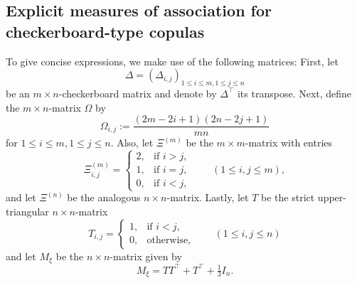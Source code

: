 \documentclass{article}
\theoremstyle{definition}
\begin{document}
\subsection{Explicit measures of association for checkerboard-type copulas}
\label{subsec:checkerboard_measures}
To give concise expressions, we make use of the following matrices:
First, let 
\[
   \Delta =\left(\Delta_{i,j}\right)_{1\le i\le m,1\le j\le n}
\]
be an $m\times n$-checkerboard matrix and denote by $\Delta^\top$ its transpose.
Next, define the $m\times n$-matrix $\Omega$ by
\[
    \Omega_{i,j} := \frac{(2m-2i+1)(2n-2j+1)}{mn}
\]
for $1\le i\leq m,1\le j\leq n$.
Also, let $\Xi^{(m)}$ be the $m\times m$-matrix with entries
\[
   \Xi^{(m)}_{i,j}
   =
   \begin{cases}
     2, & \text{if }i>j,\\
     1, & \text{if }i=j,\\
     0, & \text{if }i<j,
   \end{cases}
   \qquad
   (1\le i,j \le m),
\]
and let $\Xi^{(n)}$ be the analogous $n\times n$-matrix.
Lastly, let $T$ be the strict upper-triangular $n\times n$-matrix
\[
   T_{i,j}
   =\begin{cases}
         1, & \text{if }i<j,\\
         0, & \text{otherwise,}
        \end{cases}
   \qquad (1 \le i,j \leq n)
\]
and let $M_{\xi}$ be the $n\times n$-matrix given by
\[
    M_{\xi} = TT^\top + T^\top + \tfrac{1}{3}I_n
.\]
\end{document}
